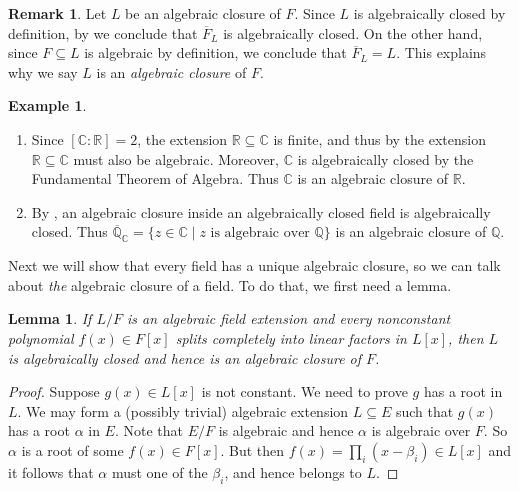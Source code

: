 \documentclass[12pt]{report}
\newtheorem{lemma}[theorem]{Lemma}
\numberwithin{equation}{section}
\numberwithin{theorem}{chapter}
\theoremstyle{definition}
\newtheorem{example}[theorem]{Example}
\newtheorem*{basic properties}{Basic Properties}
\newtheorem*{Important Remark}{Important Remark}
\newtheorem{remark}[theorem]{Remark}
\newcommand{\C}{\mathbb{C}}
\begin{document}
\begin{remark}
	Let $L$ be an algebraic closure of $F$. Since $L$ is algebraically closed by definition, by  we conclude that $\overline{F}_L$ is algebraically closed. On the other hand, since $F \subseteq L$ is algebraic by definition, we conclude that $\overline{F}_L = L$. This explains why we say $L$ is an \emph{algebraic closure} of $F$.
\end{remark}

\begin{example}$\,$
\begin{enumerate}[label=\arabic*),leftmargin=15pt]
\item Since $[\C : \mathbb{R}]=2$, the extension $\mathbb{R} \subseteq \C$ is finite, and thus by  the extension $\mathbb{R} \subseteq \C$ must also be algebraic. Moreover, $\C$ is algebraically closed by the Fundamental Theorem of Algebra. Thus $\C$ is an algebraic closure of $\mathbb{R}$.
\item By , an algebraic closure inside an algebraically closed field is algebraically closed. Thus $\overline{\mathbb{Q}}_\C=\{ z \in \C \mid z \text{ is algebraic over } \mathbb{Q} \}$ is an algebraic closure of $\mathbb{Q}$.
\end{enumerate}
\end{example}


Next we will show that every field has a unique algebraic closure, so we can talk about \emph{the} algebraic closure of a field. To do that, we first need a lemma.

\begin{lemma}\label{lemma for existence and uniqueness of alg closures}
If $L/F$ is an algebraic field extension and every nonconstant polynomial $f(x) \in F[x]$ splits completely into linear factors in $L[x]$, then $L$ is algebraically closed and hence is an algebraic closure of $F$.
\end{lemma}

\begin{proof}
Suppose $g(x) \in L[x]$ is not constant. We need to prove $g$ has a root in $L$.
We may form a (possibly trivial) algebraic extension $L \subseteq E$ such that $g(x)$ has a root $\alpha$ in $E$. Note that $E/F$ is algebraic and hence $\alpha$ is algebraic over $F$. So $\alpha$ is a root of some $f(x) \in F[x]$. But then $f(x) = \prod_i (x - \beta_i) \in L[x]$ and it follows that $\alpha$ must one of the $\beta_i$, and hence belongs to $L$.
\end{proof}
\end{document}
